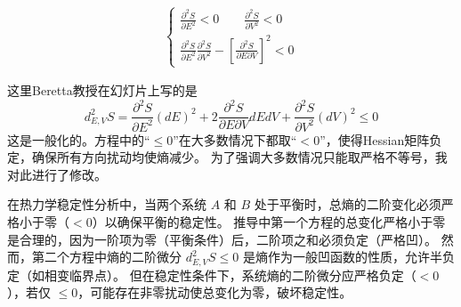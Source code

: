 \begin{thm}
\begin{enumerate}
\begin{itemize}
\begin{align*}
            \begin{cases} 
            \frac{\partial^2 S}{\partial E^2} < 0 \qquad \frac{\partial^2 S}{\partial V^2} < 0 \\ 
            \frac{\partial^2 S}{\partial E^2} \frac{\partial^2 S}{\partial V^2} - \left[ \frac{\partial^2 S}{\partial E \partial V} \right]^2 < 0 
            \end{cases}
\end{align*}
\begin{zhu}\label{<>}
    这里Beretta教授在幻灯片上写的是
    \[
        d_{E,V}^2 S = \frac{\partial^2 S}{\partial E^2} (dE)^2 + 2 \frac{\partial^2 S}{\partial E \partial V} dEdV + \frac{\partial^2 S}{\partial V^2} (dV)^2 \boxed{\leq} 0
    \]
    这是一般化的。方程中的“$\leq0$”在大多数情况下都取“$<0$”，使得Hessian矩阵负定，确保所有方向扰动均使熵减少。
    为了强调大多数情况只能取严格不等号，我对此进行了修改。

    在热力学稳定性分析中，当两个系统 \( A \) 和 \( B \) 处于平衡时，总熵的二阶变化必须严格小于零（\(<0\)）以确保平衡的稳定性。
    推导中第一个方程的总变化严格小于零是合理的，因为一阶项为零（平衡条件）后，二阶项之和必须负定（严格凹）。
    然而，第二个方程中熵的二阶微分 \( d^2_{E,V} S \leq 0 \) 是熵作为一般凹函数的性质，允许半负定（如相变临界点）。
    但在稳定性条件下，系统熵的二阶微分应严格负定（\(<0\)），若仅 \( \leq 0 \)，可能存在非零扰动使总变化为零，破坏稳定性。
    

\end{zhu}
\end{itemize}
\end{enumerate}
\end{thm}

